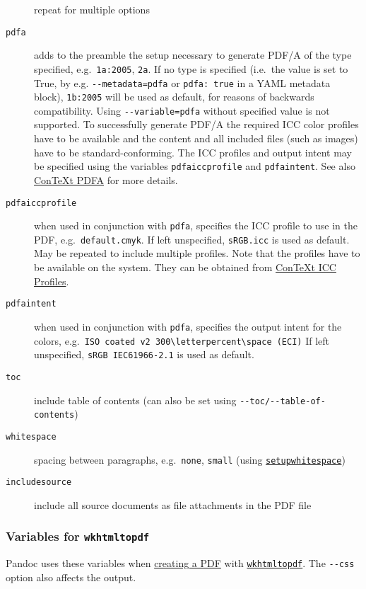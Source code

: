 \documentclass[
]{article}
\begin{document}
\begin{description}
repeat for multiple options
\item[\texttt{pdfa}]
adds to the preamble the setup necessary to generate PDF/A of the type
specified, e.g.~\texttt{1a:2005}, \texttt{2a}. If no type is specified
(i.e.~the value is set to True, by e.g. \texttt{-\/-metadata=pdfa} or
\texttt{pdfa:\ true} in a YAML metadata block), \texttt{1b:2005} will be
used as default, for reasons of backwards compatibility. Using
\texttt{-\/-variable=pdfa} without specified value is not supported. To
successfully generate PDF/A the required ICC color profiles have to be
available and the content and all included files (such as images) have
to be standard-conforming. The ICC profiles and output intent may be
specified using the variables \texttt{pdfaiccprofile} and
\texttt{pdfaintent}. See also
\href{https://wiki.contextgarden.net/PDF/A}{ConTeXt PDFA} for more
details.
\item[\texttt{pdfaiccprofile}]
when used in conjunction with \texttt{pdfa}, specifies the ICC profile
to use in the PDF, e.g.~\texttt{default.cmyk}. If left unspecified,
\texttt{sRGB.icc} is used as default. May be repeated to include
multiple profiles. Note that the profiles have to be available on the
system. They can be obtained from
\href{https://wiki.contextgarden.net/PDFX\#ICC_profiles}{ConTeXt ICC
Profiles}.
\item[\texttt{pdfaintent}]
when used in conjunction with \texttt{pdfa}, specifies the output intent
for the colors,
e.g.~\texttt{ISO\ coated\ v2\ 300\textbackslash{}letterpercent\textbackslash{}space\ (ECI)}
If left unspecified, \texttt{sRGB\ IEC61966-2.1} is used as default.
\item[\texttt{toc}]
include table of contents (can also be set using
\texttt{-\/-toc/-\/-table-of-contents})
\item[\texttt{whitespace}]
spacing between paragraphs, e.g.~\texttt{none}, \texttt{small} (using
\href{https://wiki.contextgarden.net/Command/setupwhitespace}{\texttt{setupwhitespace}})
\item[\texttt{includesource}]
include all source documents as file attachments in the PDF file
\end{description}

\subsubsection{\texorpdfstring{Variables for
\texttt{wkhtmltopdf}}{Variables for wkhtmltopdf}}\label{variables-for-wkhtmltopdf}

Pandoc uses these variables when \hyperref[creating-a-pdf]{creating a
PDF} with \href{https://wkhtmltopdf.org}{\texttt{wkhtmltopdf}}. The
\texttt{-\/-css} option also affects the output.
\end{document}
